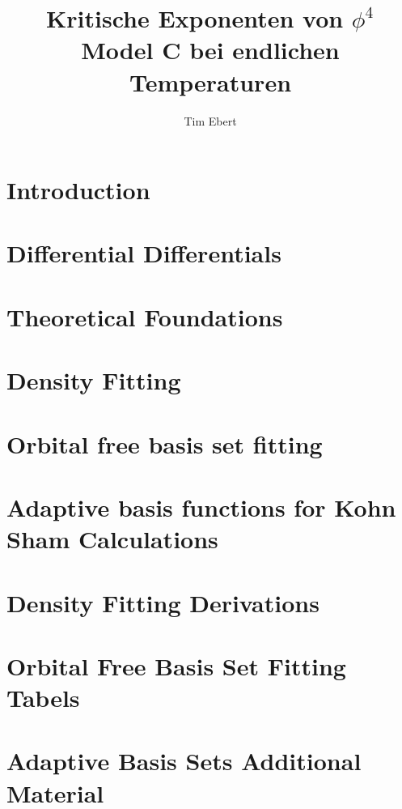 \documentclass[12pt,twoside]{report}
\author{Tim Ebert}
\title{Kritische Exponenten von $\phi^4$ Model C bei endlichen Temperaturen}
\begin{document}
\linespread{1.25}


\newpage
\tableofcontents
\chapter{Introduction} \label{chapter:introduction}

\chapter{Differential Differentials}

\chapter{Theoretical Foundations}

\chapter{Density Fitting} \label{chapter:densityfitting}

\chapter{Orbital free basis set fitting} \label{chapter:orbitalfreebasissetfitting}

\chapter{Adaptive basis functions for Kohn Sham Calculations} \label{chapter:adaptivebasisfunctions}

\begin{appendices}
    \chapter{Density Fitting Derivations}
    
    \chapter{Orbital Free Basis Set Fitting Tabels}
    
    \chapter{Adaptive Basis Sets Additional Material}
    
\end{appendices}
\printbibliography[heading=bibintoc, title={Complete bibliography}]
\clearpage
\newpage
%
\end{document}
